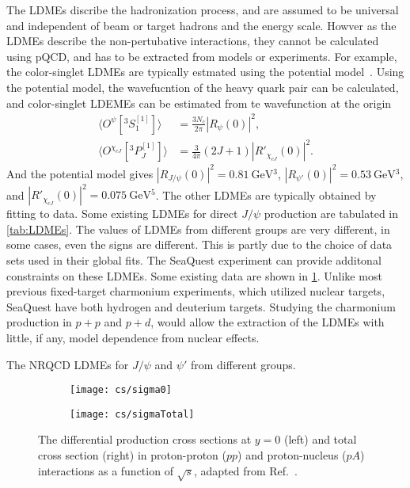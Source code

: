 \documentclass[../main.tex]{subfiles}
\begin{document}
The LDMEs discribe the hadronization process,
and are assumed to be universal and independent of beam or target hadrons and the energy scale.
Howver as the LDMEs describe the non-pertubative interactions,
they cannot be calculated using pQCD, and has to be extracted from models or experiments.
For example, the color-singlet LDMEs are typically estmated using the potential model~\cite{eichten1995}.
Using the potential model, the wavefucntion of the heavy quark pair can be calculated, 
and color-singlet LDEMEs can be estimated from te wavefunction at the origin
\begin{equation}
	\begin{split}
		\langle O^{\psi}[^3S_1^{\left[1\right]}]\rangle &= \frac{3N_c}{2\pi} \left| R_{\psi}\left(0\right)\right|^2,\\
		\langle O^{\chi_{cJ}}[^3P_J^{\left[1\right]}]\rangle &= \frac{3}{4\pi}\left(2J+1\right) \left| R'_{\chi_{cJ}}\left(0\right)\right|^2.
	\end{split}
\end{equation}
And the potential model gives $\left|R_{J/\psi}\left(0\right)\right|^2=\SI{0.81}{\GeV^3}$,
$\left|R_{\psi'}\left(0\right)\right|^2=\SI{0.53}{\GeV^3}$, and $\left|R'_{\chi_{cJ}}\left(0\right)\right|^2=\SI{0.075}{\GeV^5}$.
The other LDMEs are typically obtained by fitting to data.
Some existing LDMEs for direct $J/\psi$ production are tabulated in \cref{tab:LDMEs}.
The values of LDMEs from different groups are very different, in some cases, even the signs are different.
This is partly due to the choice of data sets used in their global fits. The
SeaQuest experiment can provide additonal constraints on these LDMEs. Some
existing data are shown in \cref{fig:charm_cs}.
Unlike most previous fixed-target charmonium experiments, which utilized nuclear
targets, SeaQuest have both hydrogen and deuterium targets.
Studying the charmonium production in $p+p$ and $p+d$, would allow the extraction
of the LDMEs with little, if any, model dependence from nuclear effects.

\begin{table}[ht!]
	\centering
	\caption{The NRQCD LDMEs for $J/\psi$ and $\psi'$ from different groups.}
	\label{tab:LDMEs}
	\scalebox{0.81}{
		
	}
\end{table}

\begin{figure}[ht!]
	\centering
	\begin{subfigure}{0.45\linewidth}
		\texttt{[image: cs/sigma0]}
	\end{subfigure}
	\begin{subfigure}{0.45\linewidth}
		\texttt{[image: cs/sigmaTotal]}
	\end{subfigure}
	\caption{The differential production cross sections at $y=0$ (left) and total
		cross section (right) in proton-proton ($pp$) and proton-nucleus ($pA$) interactions
		as a function of $\sqrt{s}$, adapted from Ref.~\cite{maltoni2006}.}
	\label{fig:charm_cs}
\end{figure}
\end{document}

